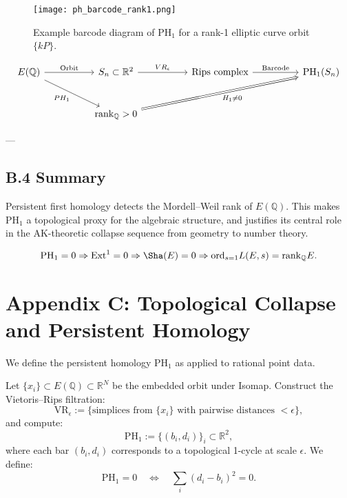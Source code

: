 \documentclass[11pt]{article}
\theoremstyle{definition}
\begin{document}
\begin{figure}[h]
  \centering
  \texttt{[image: ph\_barcode\_rank1.png]}
  \caption{Example barcode diagram of \( \mathrm{PH}_1 \) for a rank-1 elliptic curve orbit \( \{kP\} \).}
\end{figure}

\[
\begin{tikzcd}[row sep=large, column sep=huge]
E(\mathbb{Q}) \arrow[r, "\text{Orbit}"] \arrow[dr, swap, "PH_1"] & 
S_n \subset \mathbb{R}^2 \arrow[r, "VR_\epsilon"] &
\text{Rips complex} \arrow[r, "\text{Barcode}"] &
\mathrm{PH}_1(S_n) \\
& \mathrm{rank}_{\mathbb{Q}} > 0 \arrow[urr, Rightarrow, swap, "H_1 \neq 0"]
\end{tikzcd}
\]

---

\subsection*{B.4 Summary}

Persistent first homology detects the Mordell--Weil rank of \( E(\mathbb{Q}) \).  
This makes \( \mathrm{PH}_1 \) a topological proxy for the algebraic structure, and justifies its central role  
in the AK-theoretic collapse sequence from geometry to number theory.

\[
\mathrm{PH}_1 = 0 \Rightarrow \mathrm{Ext}^1 = 0 \Rightarrow \Sha(E) = 0 \Rightarrow \mathrm{ord}_{s=1}L(E,s) = \mathrm{rank}_{\mathbb{Q}}E.
\]



\section*{Appendix C: Topological Collapse and Persistent Homology}

We define the persistent homology \( \mathrm{PH}_1 \) as applied to rational point data.

Let \( \{x_i\} \subset E(\mathbb{Q}) \subset \mathbb{R}^N \) be the embedded orbit under Isomap.  
Construct the Vietoris–Rips filtration:
\[
\mathrm{VR}_\epsilon := \{ \text{simplices from } \{x_i\} \text{ with pairwise distances } < \epsilon \},
\]
and compute:
\[
\mathrm{PH}_1 := \{ (b_i, d_i) \}_{i} \subset \mathbb{R}^2,
\]
where each bar \( (b_i, d_i) \) corresponds to a topological 1-cycle at scale \( \epsilon \).  
We define:
\[
\mathrm{PH}_1 = 0 \quad \Leftrightarrow \quad \sum_i (d_i - b_i)^2 = 0.
\]
\end{document}
